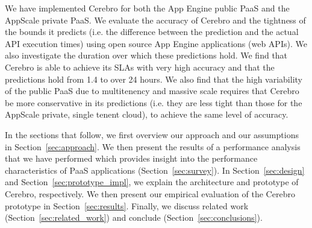 We have implemented Cerebro for both the App Engine public PaaS and 
the AppScale private PaaS. We evaluate the accuracy of Cerebro and the tightness
of the bounds it predicts (i.e. the difference between the prediction and 
the actual API execution times) using open source App Engine applications (web APIs).  
We also investigate the duration over which 
these predictions hold.  We find that Cerebro is able to achieve its SLAs with 
very high accuracy and that the predictions hold from 1.4 to over 24 hours.  
We also find that the high variability of the public PaaS due to multitenency
and massive scale requires that Cerebro be more conservative in its predictions
(i.e. they are less tight than those for the AppScale private, single tenent cloud), 
to achieve the same level of accuracy.

In the sections that follow, we first overview our approach and our assumptions 
in Section~\ref{sec:approach}.   We then
present the results of a performance analysis that we have performed which provides
insight into the performance characteristics of PaaS 
applications (Section~\ref{sec:survey}).  
In Section~\ref{sec:design}
and Section~\ref{sec:prototype_impl}, we explain the architecture and 
prototype of Cerebro, respectively.  We then 
present our empirical evaluation of the Cerebro prototype in 
Section~\ref{sec:results}.
Finally,  we discuss related work (Section~\ref{sec:related_work}) and 
conclude (Section~\ref{sec:conclusions}).
